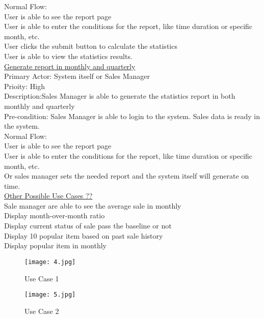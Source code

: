 \documentclass[12pt,letterpaper]{report}
\begin{document}
Normal Flow: \\
User is able to see the report page\\
User is able to enter the conditions for the report, like time duration or specific month, etc.\\
User clicks the submit button to calculate the statistics\\
User is able to view the statistics results.\\[1\baselineskip] \underline{Generate report in monthly and quarterly}\\
Primary Actor: System itself or Sales Manager\\
Prioity: High\\
Description:Sales Manager is able to generate the statistics report in both monthly and quarterly\\
Pre-condition: Sales Manager is able to login to the system. Sales data is ready in the system.\\
Normal Flow:\\
User is able to see the report page\\
User is able to enter the conditions for the report, like time duration or specific month, etc.\\
Or sales manager sets the needed report and the system itself will generate on time.\\[1\baselineskip] \underline{Other Possible Use Cases ??}\\
Sale manager are able to see the average sale in monthly\\
Display month-over-month ratio\\
Display current status of sale pass the baseline or not\\
Display 10 popular item based on past sale history\\
Display popular item in monthly\\

\begin{figure}[h]
    \begin{center}
    \texttt{[image: 4.jpg]}
    \end{center}
       \caption{Use Case 1 \label{Use Case 1}}
\end{figure}

\begin{figure}[h]
    \begin{center}
    \texttt{[image: 5.jpg]}
    \end{center}
       \caption{Use Case 2 \label{Use Case 2}}
\end{figure}
\end{document}

